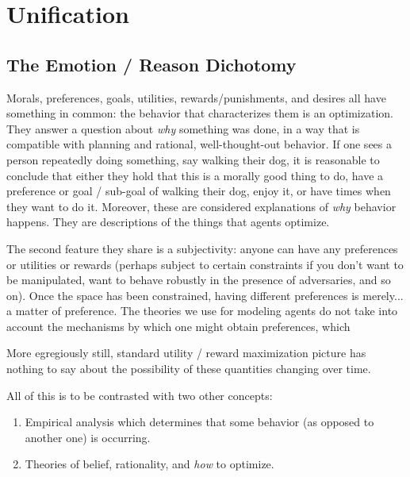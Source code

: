 \documentclass{book}
\begin{document}
	\chapter{Unification}
	
	
	
	\section{The Emotion / Reason Dichotomy}
	Morals, preferences, goals, utilities, rewards/punishments, and desires all have something in common: the behavior that characterizes them is an optimization. They answer a question about \emph{why} something was done, in a way that is compatible with planning and rational, well-thought-out behavior. If one sees a person repeatedly doing something, say walking their dog, it is reasonable to conclude that either they hold that this is a morally good thing to do, have a preference or goal / sub-goal of walking their dog, enjoy it, or have times when they want to do it. Moreover, these are considered explanations of \emph{why} behavior happens. They are descriptions of the things that agents optimize.
	
	The second feature they share is a subjectivity: anyone can have any preferences or utilities or rewards (perhaps subject to certain constraints if you don't want to be manipulated, want to behave robustly in the presence of adversaries, and so on). Once the space has been constrained, having different preferences is merely... a matter of preference. The theories we use for modeling agents do not take into account the mechanisms by which one might obtain preferences, which 
	
	More egregiously still, standard utility / reward maximization picture has nothing to say about the possibility of these quantities changing over time.
	
	
	
	All of this is to be contrasted with two other concepts:

	\begin{enumerate}
		\item Empirical analysis which determines that some behavior (as opposed to another one) is occurring. 
		\item Theories of belief, rationality, and \emph{how} to optimize.
	\end{enumerate}
	
\end{document}
